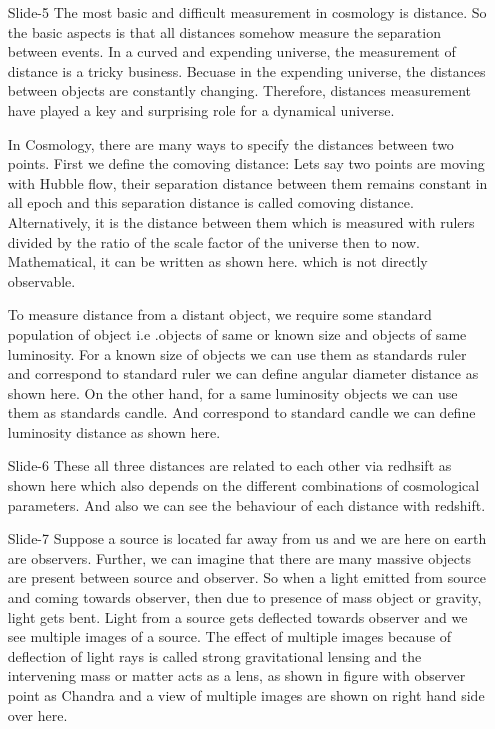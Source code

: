 \documentclass[12pt]{report}
\begin{document}
\begin{itemize}
\item[\ding{74} Slide-5]
The most basic and difficult measurement in cosmology is distance. So the basic aspects is that all distances somehow measure the separation between events. In a curved and expending universe, the measurement of distance is a tricky business.  Becuase in the expending universe, the distances between objects are constantly changing.  Therefore, distances measurement have played a key and surprising role for a dynamical universe.


In Cosmology, there are many ways to specify the distances between two points. First we define the comoving distance: Lets say two points are moving with Hubble flow, their separation distance between them remains constant in all epoch and this separation distance is called comoving distance. Alternatively, it is the distance between them which is measured with rulers divided by the ratio of the scale factor of the universe then to now. Mathematical, it can be written as shown here. which is not directly observable.


To measure distance from a distant object, we require some standard population of object i.e .objects of same or known size and objects of same luminosity. For a known size of objects we can use them as standards ruler and correspond to standard ruler we can define angular diameter distance as shown here. On the other hand, for a same luminosity objects we can use them as standards candle. And correspond to standard candle we can define luminosity distance as shown here. 

\item[\ding{74} Slide-6]
These all three distances are related to each other via redhsift as shown here which also depends on the different combinations of cosmological parameters. And also we can see the behaviour of each distance with redshift.

\item[\ding{74} Slide-7]
Suppose a source is located far away from us and we are here on earth are observers. Further, we can imagine that there are many massive objects are present between source and observer. So when a light emitted from source and coming towards observer, then due to presence of mass object or gravity, light gets bent.
Light from a source gets deflected towards observer and we see multiple images of a source. The effect of multiple images because of deflection of light rays is called strong gravitational lensing and the intervening mass or matter acts as a lens, as shown in figure with observer point as Chandra and a view of multiple images are shown on right hand side over here. 


\end{itemize}
\end{document}
